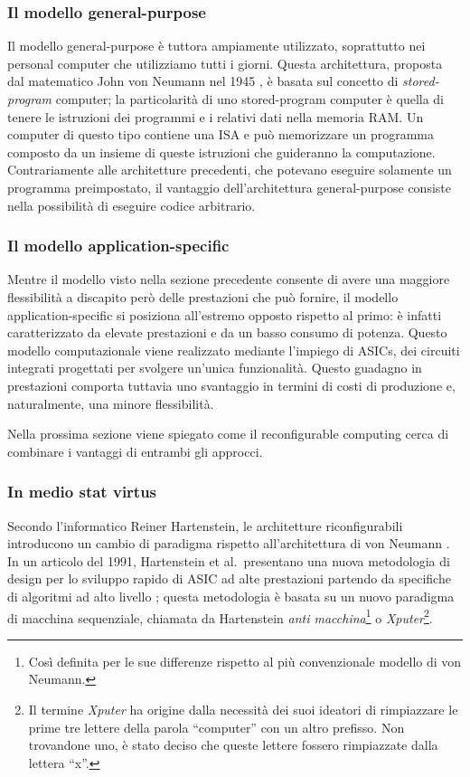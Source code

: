\subsubsection{Il modello general-purpose}
Il modello general-purpose è tuttora ampiamente utilizzato, soprattutto nei personal
computer che utilizziamo tutti i giorni. Questa architettura, proposta dal matematico
John von Neumann nel 1945 \cite{First-Draft-Report-EDVAC}, è basata sul concetto di
\emph{stored-program} computer; la particolarità di uno stored-program computer è quella
di tenere le istruzioni dei programmi e i relativi dati nella memoria RAM. Un computer di
questo tipo contiene una \ac{ISA} e può memorizzare un programma composto da un insieme
di queste istruzioni che guideranno la computazione. Contrariamente alle architetture
precedenti, che potevano eseguire solamente un programma preimpostato, il vantaggio
dell'architettura general-purpose consiste nella possibilità di eseguire codice
arbitrario.

\subsubsection{Il modello application-specific}
Mentre il modello visto nella sezione precedente consente di avere una maggiore
flessibilità a discapito però delle prestazioni che può fornire, il modello
application-specific si posiziona all'estremo opposto rispetto al primo: è infatti
caratterizzato da elevate prestazioni e da un basso consumo di potenza. Questo modello
computazionale viene realizzato mediante l'impiego di \acp{ASIC}, dei circuiti integrati
progettati per svolgere un'unica funzionalità. Questo guadagno in prestazioni comporta 
tuttavia uno svantaggio in termini di costi di produzione e, naturalmente, una minore 
flessibilità.

Nella prossima sezione viene spiegato come il reconfigurable computing cerca di combinare
i vantaggi di entrambi gli approcci.

\subsubsection{In medio stat virtus}
Secondo l'informatico Reiner Hartenstein, le architetture riconfigurabili introducono un
cambio di paradigma rispetto all'architettura di von Neumann
\cite{HartensteinParadigmShift}. In un articolo del 1991, Hartenstein et al.~presentano
una nuova metodologia di design per lo sviluppo rapido di \ac{ASIC} ad alte prestazioni
partendo da specifiche di algoritmi ad alto livello \cite{HartensteinNovelASICDesign};
questa metodologia è basata su un nuovo paradigma di macchina sequenziale, chiamata da
Hartenstein \emph{anti macchina}\footnote{Così definita per le sue differenze rispetto al
più convenzionale modello di von Neumann.} o \emph{Xputer}\footnote{Il termine
\emph{Xputer} ha origine dalla necessità dei suoi ideatori di rimpiazzare le prime tre
lettere della parola ``computer'' con un altro prefisso. Non trovandone uno, è stato
deciso che queste lettere fossero rimpiazzate dalla lettera ``x''.}.

